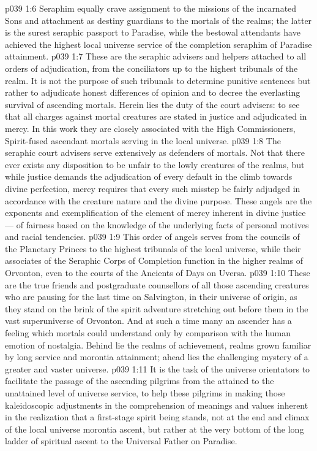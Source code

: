 \vs p039 1:6 Seraphim equally crave assignment to the missions of the incarnated Sons and attachment as destiny guardians to the mortals of the realms; the latter is the surest seraphic passport to Paradise, while the bestowal attendants have achieved the highest local universe service of the completion seraphim of Paradise attainment.
\vs p039 1:7 \bibnobreakspace {} These are the seraphic advisers and helpers attached to all orders of adjudication, from the conciliators up to the highest tribunals of the realm. It is not the purpose of such tribunals to determine punitive sentences but rather to adjudicate honest differences of opinion and to decree the everlasting survival of ascending mortals. Herein lies the duty of the court advisers: to see that all charges against mortal creatures are stated in justice and adjudicated in mercy. In this work they are closely associated with the High Commissioners, Spirit\hyp{}fused ascendant mortals serving in the local universe.
\vs p039 1:8 The seraphic court advisers serve extensively as defenders of mortals. Not that there ever exists any disposition to be unfair to the lowly creatures of the realms, but while justice demands the adjudication of every default in the climb towards divine perfection, mercy requires that every such misstep be fairly adjudged in accordance with the creature nature and the divine purpose. These angels are the exponents and exemplification of the element of mercy inherent in divine justice --- of fairness based on the knowledge of the underlying facts of personal motives and racial tendencies.
\vs p039 1:9 This order of angels serves from the councils of the Planetary Princes to the highest tribunals of the local universe, while their associates of the Seraphic Corps of Completion function in the higher realms of Orvonton, even to the courts of the Ancients of Days on Uversa.
\vs p039 1:10 \bibnobreakspace {} These are the true friends and postgraduate counsellors of all those ascending creatures who are pausing for the last time on Salvington, in their universe of origin, as they stand on the brink of the spirit adventure stretching out before them in the vast superuniverse of Orvonton. And at such a time many an ascender has a feeling which mortals could understand only by comparison with the human emotion of nostalgia. Behind lie the realms of achievement, realms grown familiar by long service and morontia attainment; ahead lies the challenging mystery of a greater and vaster universe.
\vs p039 1:11 It is the task of the universe orientators to facilitate the passage of the ascending pilgrims from the attained to the unattained level of universe service, to help these pilgrims in making those kaleidoscopic adjustments in the comprehension of meanings and values inherent in the realization that a first\hyp{}stage spirit being stands, not at the end and climax of the local universe morontia ascent, but rather at the very bottom of the long ladder of spiritual ascent to the Universal Father on Paradise.
